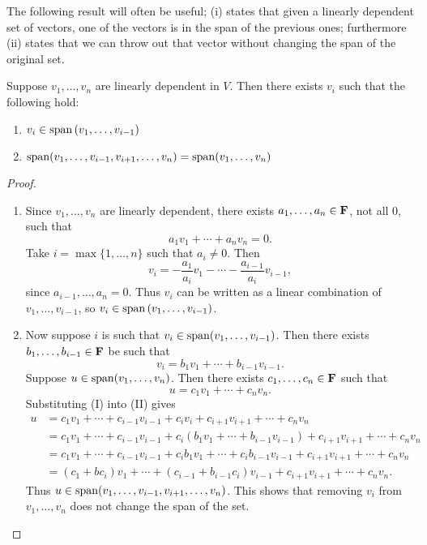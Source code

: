 The following result will often be useful; (i) states that given a linearly dependent set of vectors, one of the vectors is in the span of the previous ones; furthermore (ii) states that we can throw out that vector without changing the span of the original set.

\begin{lemma}\label{lemma:linear-dependence}
Suppose $v_1,\dots,v_n$ are linearly dependent in $V$. Then there exists $v_i$ such that the following hold:
\begin{enumerate}[label=(\roman*)]
\item $v_i\in\operatorname{span}\left(v_1,\dots,v_{i-1}\right)$
\item $\operatorname{span}(v_1,\dots,v_{i-1},v_{i+1},\dots,v_n)=\operatorname{span}(v_1,\dots,v_n)$
\end{enumerate}
\end{lemma}

\begin{proof} \
\begin{enumerate}[label=(\roman*)]
\item Since $v_1,\dots,v_n$ are linearly dependent, there exists $a_1,\dots,a_n\in\mathbf F$, not all $0$, such that
\[a_1v_1+\cdots+a_nv_n=0.\]
Take $i=\max\{1,\dots,n\}$ such that $a_i\neq0$. Then
\[v_i=-\frac{a_1}{a_i}v_1-\cdots-\frac{a_{i-1}}{a_i}v_{i-1},\]
since $a_{i-1},\dots,a_n=0$.
Thus $v_i$ can be written as a linear combination of $v_1,\dots,v_{i-1}$, so $v_i\in\operatorname{span}\left(v_1,\dots,v_{i-1}\right)$.

\item Now suppose $i$ is such that $v_i\in\operatorname{span}(v_1,\dots,v_{i-1})$. Then there exists $b_1,\dots,b_{i-1}\in\mathbf F$ be such that
\begin{equation*}\tag{I}
v_i=b_1v_1+\cdots+b_{i-1}v_{i-1}.
\end{equation*}
Suppose $u\in\operatorname{span}(v_1,\dots,v_n)$. Then there exists $c_1,\dots,c_n\in\mathbf F$ such that
\begin{equation*}\tag{II}
u=c_1v_1+\cdots+c_nv_n.
\end{equation*}
Substituting (I) into (II) gives
\begin{align*}
u&=c_1v_1+\cdots+c_{i-1}v_{i-1}+c_iv_i+c_{i+1}v_{i+1}+\cdots+c_nv_n\\
&=c_1v_1+\cdots+c_{i-1}v_{i-1}+c_i(b_1v_1+\cdots+b_{i-1}v_{i-1})+c_{i+1}v_{i+1}+\cdots+c_nv_n\\
&=c_1v_1+\cdots+c_{i-1}v_{i-1}+c_ib_1v_1+\cdots+c_ib_{i-1}v_{i-1}+c_{i+1}v_{i+1}+\cdots+c_nv_n\\
&=(c_1+bc_i)v_1+\cdots+(c_{i-1}+b_{i-1}c_i)v_{i-1}+c_{i+1}v_{i+1}+\cdots+c_nv_n.
\end{align*}
Thus $u\in\operatorname{span}(v_1,\dots,v_{i-1},v_{i+1},\dots,v_n)$. This shows that removing $v_i$ from $v_1,\dots,v_n$ does not change the span of the set.
\end{enumerate}
\end{proof}

